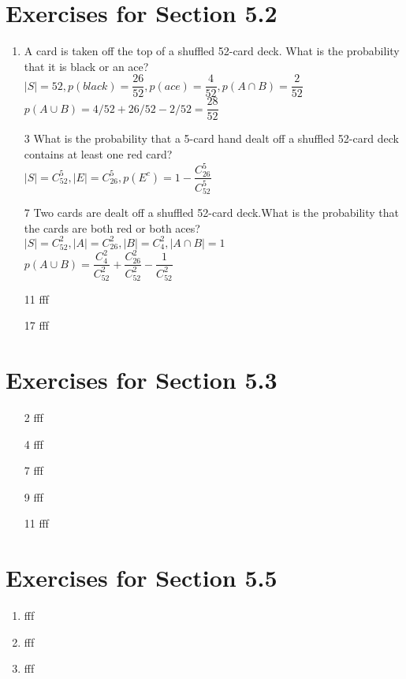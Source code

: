 \documentclass[12pt]{article}
\begin{document}
\section*{Exercises for Section 5.2}
\begin{enumerate}
    \item A card is taken off the top of a shuffled 52-card deck. What is the probability that it is black or an ace?\\
	$|S| = 52, p(black) = \dfrac{26}{52}, p(ace)=\dfrac{4}{52}, p(A\cap B) = \dfrac{2}{52}$\\
	$p(A\cup B) =  4/52 + 26/52 - 2/52 = \dfrac{28}{52}$
    \item [3] What is the probability that a 5-card hand dealt off a shuffled 52-card deck contains at least one red card?\\
	$|S| = C_{52}^5, |E| = C_{26}^{5}, p(E^c) = 1 - \dfrac{C_{26}^5}{C_{52}^5}$
    \item [7] Two cards are dealt off a shuffled 52-card deck.What is the probability that the cards are both red or both aces?\\
	$|S| = C_{52}^2, |A|=C_{26}^2, |B|=C_{4}^2, |A\cap B| = 1$\\
	$p(A\cup B) = \dfrac{C_4^2}{C_{52}^2} + \dfrac{C_{26}^2}{C_{52}^2} - \dfrac{1}{C_{52}^2}$
    \item [11] fff
    \item [17] fff
\end{enumerate}
\section*{Exercises for Section 5.3}
\begin{enumerate}
    \item [2] fff
    \item [4] fff
    \item [7] fff
    \item [9] fff
    \item [11] fff
\end{enumerate}
\section*{Exercises for Section 5.5}
\begin{enumerate}
    \item fff
    \item fff
    \item fff
\end{enumerate}
\end{document}
